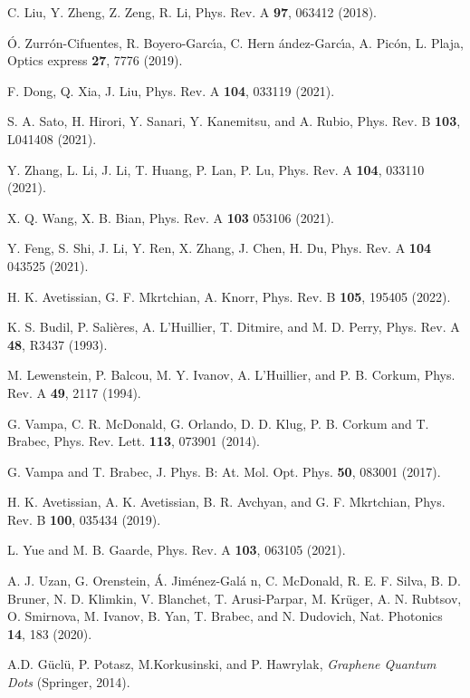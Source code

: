 \documentclass[reprint, superscriptaddress,  aps, pra]{revtex4-2}
\begin{document}
\begin{thebibliography}{99}
 C. Liu, Y. Zheng, Z. Zeng, R. Li, Phys. Rev. A \textbf{97},
063412 (2018).

 \'{O}. Zurr\'{o}n-Cifuentes, R. Boyero-Garc\'{\i}a, C. Hern%
\'{a}ndez-Garc\'{\i}a, A. Pic\'{o}n, L. Plaja, Optics express \textbf{27},
7776 (2019).

 F. Dong, Q. Xia, J. Liu, Phys. Rev. A \textbf{104}, 033119
(2021).

 S. A. Sato, H. Hirori, Y. Sanari, Y. Kanemitsu, and A. Rubio,
Phys. Rev. B \textbf{103}, L041408 (2021).

 Y. Zhang, L. Li, J. Li, T. Huang, P. Lan, P. Lu, Phys. Rev. A 
\textbf{104}, 033110 (2021).

 X. Q. Wang, X. B. Bian, Phys. Rev. A \textbf{103} 053106
(2021).

 Y. Feng, S. Shi, J. Li, Y. Ren, X. Zhang, J. Chen, H. Du,
Phys. Rev. A \textbf{104} 043525 (2021).

 H. K. Avetissian, G. F. Mkrtchian, A. Knorr, Phys. Rev. B 
\textbf{105}, 195405 (2022).

 K. S. Budil, P. Sali\`{e}res, A. L'Huillier, T. Ditmire, and
M. D. Perry, Phys. Rev. A \textbf{48}, R3437 (1993).

 M. Lewenstein, P. Balcou, M. Y. Ivanov, A. L'Huillier,
and P. B. Corkum, Phys. Rev. A \textbf{49}, 2117 (1994).

 G. Vampa, C. R. McDonald, G. Orlando, D. D. Klug, P. B.
Corkum and T. Brabec, Phys. Rev. Lett. \textbf{113}, 073901 (2014).

 G. Vampa and T. Brabec, J. Phys. B: At. Mol. Opt. Phys. 
\textbf{50}, 083001 (2017).

 H. K. Avetissian, A. K. Avetissian, B. R. Avchyan, and G.
F. Mkrtchian, Phys. Rev. B \textbf{100}, 035434 (2019).

 L. Yue and M. B. Gaarde, Phys. Rev. A \textbf{103}, 063105
(2021).

 A. J. Uzan, G. Orenstein, \'{A}. Jim\'{e}nez-Gal\'{a}%
n, C. McDonald, R. E. F. Silva, B. D. Bruner, N. D. Klimkin, V. Blanchet, T.
Arusi-Parpar, M. Kr\"{u}ger, A. N. Rubtsov, O. Smirnova, M. Ivanov, B. Yan,
T. Brabec, and N. Dudovich, Nat. Photonics \textbf{14}, 183 (2020).

 A.D. G\"{u}cl\"{u}, P. Potasz, M.Korkusinski, and P.
Hawrylak, \textit{Graphene Quantum Dots} (Springer, 2014).


\end{thebibliography}
\end{document}
